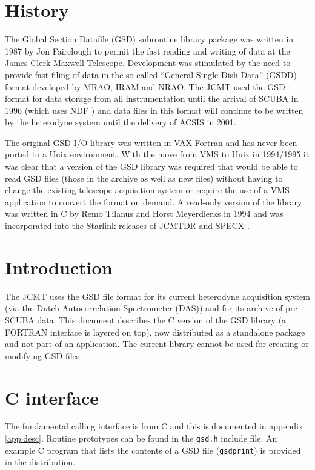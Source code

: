 \documentclass[oneside,11pt]{starlink}
\begin{document}
\scfrontmatter


\section{History}

The Global Section Datafile (GSD) subroutine library package was written in
1987 by Jon Fairclough \cite{F89} to permit the fast reading and writing of
data at the James Clerk Maxwell Telescope. Development was stimulated by the
need to provide fast filing of data in the so-called ``General Single Dish
Data'' (GSDD) format developed by MRAO, IRAM and NRAO. The JCMT used the GSD
format for data storage from all instrumentation until the arrival of SCUBA
\cite{scuba} in 1996 (which uses NDF \cite{ndf}) and data files in this format
will continue to be written by the heterodyne system until the delivery of
ACSIS in 2001.

The original GSD I/O library was written in VAX Fortran and has never been
ported to a Unix environment. With the move from VMS to Unix in 1994/1995 it
was clear that a version of the GSD library was required that would be able to
read GSD files (those in the archive as well as new files) without having to
change the existing telescope acquisition system or require the use of a VMS
application to convert the format on demand. A read-only version of the
library was written in C by Remo Tilanus and Horst Meyerdierks in 1994 and was
incorporated into the Starlink releases of JCMTDR \cite{jcmtdr} and SPECX
\cite{specx}.

\section{Introduction}

The JCMT uses the GSD file format for its current heterodyne acquisition
system (via the Dutch Autocorrelation Spectrometer (DAS)) and for its archive
of pre-SCUBA data.  This document describes the C version of the GSD library
(a FORTRAN interface is layered on top), now distributed as a standalone
package and not part of an application. The current library cannot be used for
creating or modifying GSD files.


\section{C interface}

The fundamental calling interface is from C and this is documented in appendix
\ref{app:desc}. Routine prototypes can be found in the \texttt{gsd.h} include
file. An example C program that lists the contents of a GSD file
(\texttt{gsdprint}) is provided in the distribution.
\end{document}
